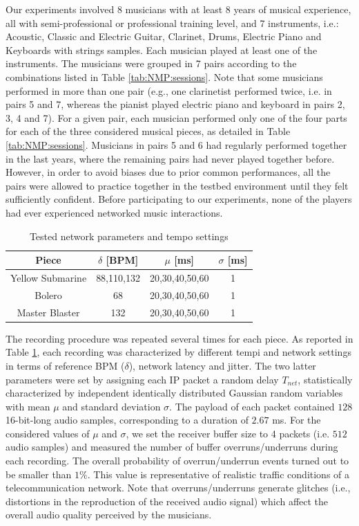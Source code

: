 Our experiments involved 8 musicians with at least 8 years of musical experience, all with semi-professional or professional training level, and 7 instruments, i.e.:
Acoustic, Classic and Electric Guitar, Clarinet, Drums, Electric Piano and Keyboards with strings samples. Each musician played at least one of the instruments. The musicians were grouped in 7 pairs according to the combinations listed in Table \ref{tab:NMP:sessions}. Note that some musicians performed in more than one pair (e.g., one clarinetist performed twice, i.e. in pairs 5 and 7, whereas the pianist played electric piano and keyboard in pairs 2, 3, 4 and 7). For a given pair, each musician performed only one of the four parts for each of the three considered musical pieces, as detailed in Table \ref{tab:NMP:sessions}. Musicians in pairs 5 and 6 had regularly performed together in the last years, where the remaining pairs had never played together before. However, in order to avoid biases due to prior common performances, all the pairs were allowed to practice together in the testbed environment until they felt sufficiently confident. Before participating to our experiments, none of the players had ever experienced networked music interactions.

\begin{table}[tb]
  \caption{Tested network parameters and tempo settings}
  \centering %
  \label{tab:NMP:param}  
  \bgroup
  \def\arraystretch{1.5}
  \begin{tabular}{||c|c|c|c||}
\hline
\hline
 Piece & $\delta$ [BPM]& $\mu$ [ms]& $\sigma$ [ms]\\
\hline
\hline
 Yellow Submarine & 88,110,132 & 20,30,40,50,60 & 1 \\
 Bolero & 68  & 20,30,40,50,60 & 1 \\
 Master Blaster & 132  & 20,30,40,50,60 & 1 \\
\hline
\hline
  \end{tabular}
  \egroup
\end{table}

The recording procedure was repeated several times for each piece. As reported in Table \ref{tab:NMP:param}, each recording was characterized by different tempi and network settings in terms of reference BPM ($\delta$), network latency and jitter. The two latter parameters were set by assigning each IP packet a random delay $T_{net}$, statistically characterized by independent identically distributed Gaussian random variables with mean $\mu$ and standard deviation $\sigma$. The payload of each packet contained $128$ 16-bit-long audio samples, corresponding to a duration of $2.67$ ms. For the considered values of $\mu$ and $\sigma$, we set the receiver buffer size to 4 packets (i.e. $512$ audio samples) and measured the number of buffer overruns/underruns during each recording. The overall probability of overrun/underrun events turned out to be smaller than $1\%$. This value is representative of realistic traffic conditions of a telecommunication network. Note that overruns/underruns generate glitches (i.e., distortions in the reproduction of the received audio signal) which affect the overall audio quality perceived by the musicians. 
 

